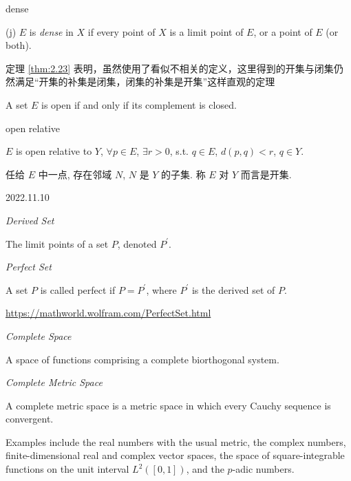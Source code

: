 \begin{myDef} dense

    (j) $E$ is \emph{dense} in $X$ if every point of $X$ is a limit point of $E$, or a point of $E$ (or both).
\end{myDef}

定理 \ref{thm:2.23} 表明，虽然使用了看似不相关的定义，这里得到的开集与闭集仍然满足``开集的补集是闭集，闭集的补集是开集''这样直观的定理
\begin{mynewthm}
    A set $E$ is open if and only if its complement is closed.
\end{mynewthm}

\begin{myDef} open relative

    $E$ is open relative to $Y$, $\forall p \in E$, $\exists r>0$, s.t. $q \in E$, $d(p, q)<r$, $q \in Y$.
\end{myDef}
任给 $E$ 中一点, 存在邻域 $N$, $N$ 是 $Y$ 的子集. 称 $E$ 对 $Y$ 而言是开集.


2022.11.10

\begin{myDef}
    \emph{Derived Set}

    The limit points of a set ${P}$, denoted $P^{'}$. 
\end{myDef}

\begin{myDef}
    \emph{Perfect Set}

    A set $P$ is called perfect if $P=P^{'}$, where $P^{'}$ is the derived set of $P$.
\end{myDef}
\url{https://mathworld.wolfram.com/PerfectSet.html}

\begin{myDef}
    \emph{Complete Space}

    A space of functions comprising a complete biorthogonal system.
\end{myDef}

\begin{myDef}
    \emph{Complete Metric Space}

    A complete metric space is a metric space in which every Cauchy sequence is convergent.

    Examples include the real numbers with the usual metric, the complex numbers, finite-dimensional real and complex vector spaces, the space of square-integrable functions on the unit interval $L^2([0,1])$, and the $p$-adic numbers.
\end{myDef}